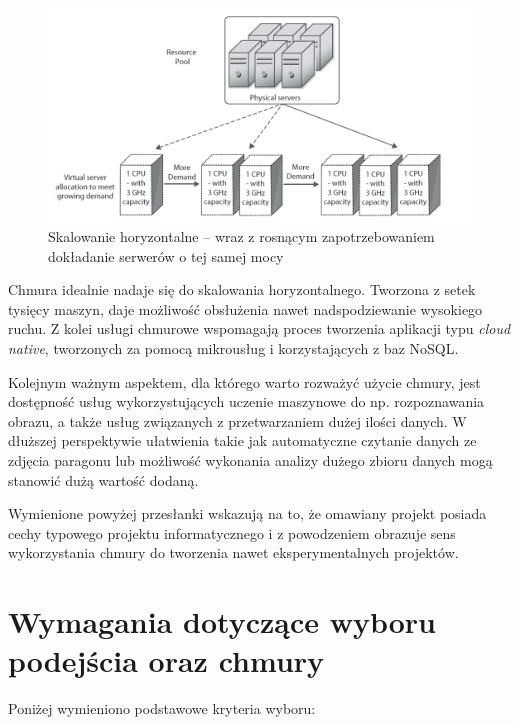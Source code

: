 \documentclass[12pt,a4paper,twoside,titlepage,openright]{book}
\begin{document}
\begin{figure}[h!]
	\centering
			\includegraphics[width=\textwidth]{skalowanie-horyzontalne.png}
		\caption{Skalowanie horyzontalne -- wraz z rosnącym zapotrzebowaniem dokładanie serwerów o tej samej mocy \cite{ccCambridge}}
		\label{fig:skalowanie-horyzontalne}
\end{figure}

Chmura idealnie nadaje się do skalowania horyzontalnego. Tworzona z setek tysięcy maszyn, daje możliwość obsłużenia nawet nadspodziewanie wysokiego ruchu. Z kolei usługi chmurowe wspomagają proces tworzenia aplikacji typu \textit{cloud native}, tworzonych za pomocą mikrousług i korzystających z baz NoSQL.

Kolejnym ważnym aspektem, dla którego warto rozważyć użycie chmury, jest dostępność usług wykorzystujących uczenie maszynowe do np. rozpoznawania obrazu, a także usług związanych z przetwarzaniem dużej ilości danych. W dłuższej perspektywie ułatwienia takie jak automatyczne czytanie danych ze zdjęcia paragonu lub możliwość wykonania analizy dużego zbioru danych mogą stanowić dużą wartość dodaną.

Wymienione powyżej przesłanki wskazują na to, że omawiany projekt posiada cechy typowego projektu informatycznego i z powodzeniem obrazuje sens wykorzystania chmury do tworzenia nawet eksperymentalnych projektów.

\section{Wymagania dotyczące wyboru podejścia oraz chmury}

Poniżej wymieniono podstawowe kryteria wyboru:
\end{document}
